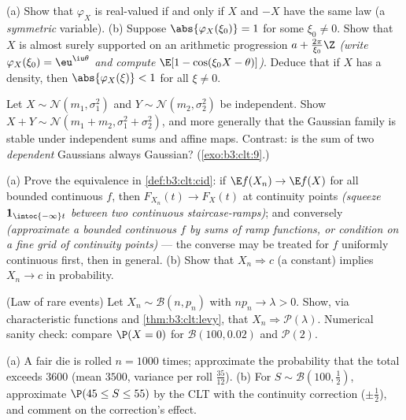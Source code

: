 \begin{exercise}[$\star\star$]\label{exo:b3:clt:2}
(a) Show that $\varphi_X$ is real-valued if and only if $X$
and $-X$ have the same law (a \emph{symmetric} variable).
(b) Suppose $\abs{\varphi_X(\xi_0)} = 1$ for some $\xi_0 \neq
0$. Show that $X$ is almost surely supported on an arithmetic
progression $a + \frac{2\pi}{\xi_0}\Z$ \emph{(write
$\varphi_X(\xi_0) = \eu^{\iu\theta}$ and compute $\E[1 -
\cos(\xi_0X - \theta)]$)}. Deduce that if $X$ has a density,
then $\abs{\varphi_X(\xi)} < 1$ for all $\xi \neq 0$.
\end{exercise}

\begin{exercise}[$\star\star$]\label{exo:b3:clt:3}
Let $X \sim \mathcal N(m_1, \sigma_1^2)$ and $Y \sim
\mathcal N(m_2, \sigma_2^2)$ be independent. Show $X + Y
\sim \mathcal N(m_1 + m_2, \sigma_1^2 + \sigma_2^2)$, and
more generally that the Gaussian family is stable under
independent sums and affine maps. Contrast: is the sum of
two \emph{dependent} Gaussians always Gaussian?
(\cref{exo:b3:clt:9}.)
\end{exercise}

\begin{exercise}[$\star\star$]\label{exo:b3:clt:4}
(a) Prove the equivalence in \cref{def:b3:clt:cid}: if
$\E f(X_n) \to \E f(X)$ for all bounded continuous $f$,
then $F_{X_n}(t) \to F_X(t)$ at continuity points
\emph{(squeeze $\mathbf 1_{\intoc{-\infty}t}$ between two
continuous staircase-ramps)}; and conversely
\emph{(approximate a bounded continuous $f$ by sums of ramp
functions, or condition on a fine grid of continuity
points)} --- the converse may be treated for $f$ uniformly
continuous first, then in general.
(b) Show that $X_n \Rightarrow c$ (a constant) implies $X_n
\to c$ in probability.
\end{exercise}

\begin{exercise}[$\star\star$]\label{exo:b3:clt:5}
(Law of rare events) Let $X_n \sim \mathcal B(n, p_n)$ with
$np_n \to \lambda > 0$. Show, via characteristic functions
and \cref{thm:b3:clt:levy}, that $X_n \Rightarrow \mathcal
P(\lambda)$. Numerical sanity check: compare $\P(X = 0)$ for
$\mathcal B(100, 0.02)$ and $\mathcal P(2)$.
\end{exercise}

\begin{exercise}[$\star\star$]\label{exo:b3:clt:6}
(a) A fair die is rolled $n = 1000$ times; approximate the
probability that the total exceeds $3600$ (mean $3500$,
variance per roll $\frac{35}{12}$).
(b) For $S \sim \mathcal B(100, \frac12)$, approximate
$\P(45 \leq S \leq 55)$ by the CLT with the continuity
correction ($\pm\frac12$), and comment on the correction's
effect.
\end{exercise}

